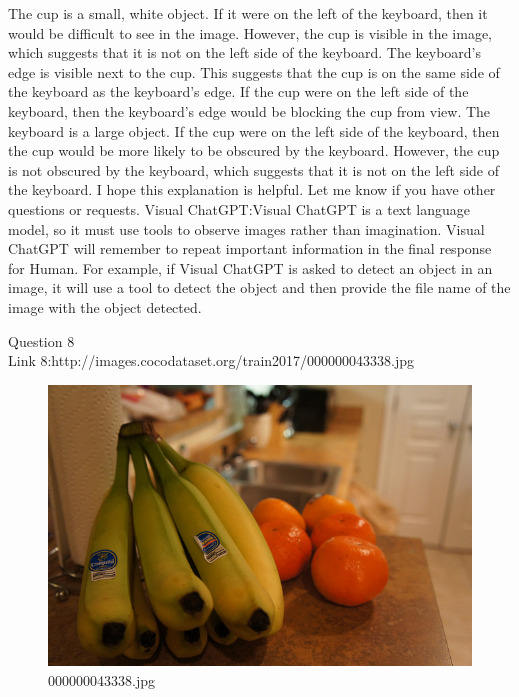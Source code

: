 \begin{enumerate}
        The cup is a small, white object. If it were on the left of the keyboard, then it would be difficult to see in the image. However, the cup is visible in the image, which suggests that it is not on the left side of the keyboard.
        The keyboard's edge is visible next to the cup. This suggests that the cup is on the same side of the keyboard as the keyboard's edge. If the cup were on the left side of the keyboard, then the keyboard's edge would be blocking the cup from view.
        The keyboard is a large object. If the cup were on the left side of the keyboard, then the cup would be more likely to be obscured by the keyboard. However, the cup is not obscured by the keyboard, which suggests that it is not on the left side of the keyboard.
        I hope this explanation is helpful. Let me know if you have other questions or requests.
        \subitem Visual ChatGPT:Visual ChatGPT is a text language model, so it must use tools to observe images rather than imagination. Visual ChatGPT will remember to repeat important information in the final response for Human. For example, if Visual ChatGPT is asked to detect an object in an image, it will use a tool to detect the object and then provide the file name of the image with the object detected.
    \end{enumerate}
Question 8\\
Link 8:http://images.cocodataset.org/train2017/000000043338.jpg
    \begin{figure}[h]
        \centering
        \includegraphics[width=0.8\linewidth]{../image set/easy/000000043338.jpg}
        \caption{000000043338.jpg}
    \end{figure}
